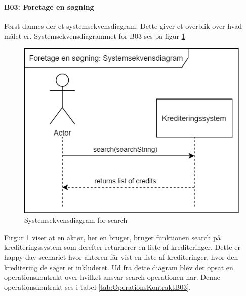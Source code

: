 \paragraph{B03: Foretage en søgning} Først dannes der et systemsekvensdiagram. Dette giver et overblik over hvad målet er. Systemsekvensdiagrammet for B03 ses på figur \ref{fig:SystemsekvensdiagramSearch} 

\begin{figure}[H]
    \centering
\includegraphics[scale = 0.4]{images/B03SSD.png}
    \caption{Systemsekvensdiagram for search}
    \label{fig:SystemsekvensdiagramSearch}
\end{figure}

Firgur \ref{fig:SystemsekvensdiagramSearch} viser at en aktør, her en bruger, bruger funktionen search på krediteringssystem som derefter returnerer en liste af krediteringer. Dette er happy day scenariet hvor aktøren får vist en liste af krediteringer, hvor den kreditering de søger er inkluderet.
Ud fra dette diagram blev der opsat en operationskontrakt over hvilket ansvar search operationen har. Denne operationskontrakt ses i tabel \ref{tab:OperationsKontraktB03}.

